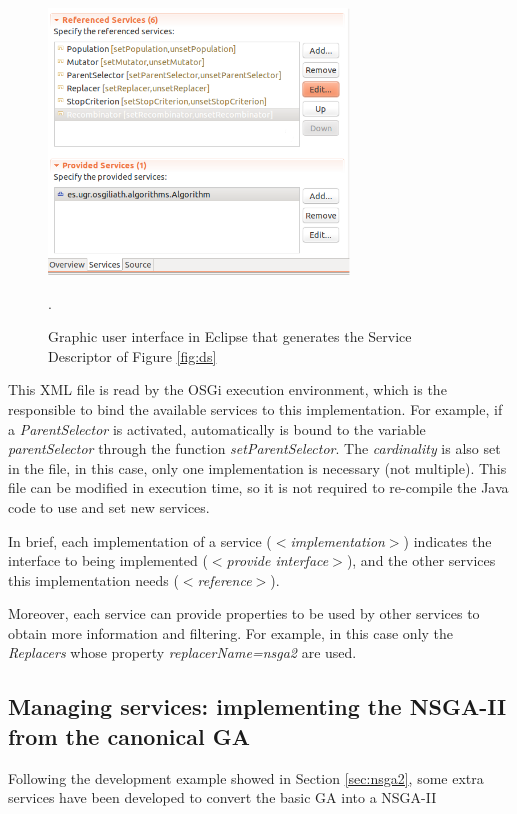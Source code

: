\begin{figure}
\centering
\includegraphics[width=8cm]{gfx/osgiliath/eclipse.png}

\caption{Graphic user interface in Eclipse that generates the Service Descriptor of Figure \ref{fig:ds} }.
\label{fig:xmlgui}
\end{figure}



This XML file is read by the OSGi execution environment, which is the
responsible to bind the available services to this implementation. For
example, if a {\em ParentSelector} is activated, automatically is
bound to the variable {\em parentSelector} through the function {\em
  setParentSelector}. The {\em cardinality} is also set in the file,
in this case, only one implementation is necessary (not
multiple). This file can be modified in execution time, so it is not
required to re-compile the Java code to use and set new services. %

In brief, each implementation of a service (\textit{$<$im\-ple\-men\-ta\-tion$>$}) indicates the interface to being implemented (\textit{$<$pro\-vi\-de in\-ter\-fa\-ce$>$}), and the other services this implementation needs (\textit{$<$re\-fe\-ren\-ce$>$}). 

Moreover, each service can provide properties to be used by other
services to obtain more information and filtering. For example, in
this case only the {\em Replacers} whose property {\em
  replacerName=nsga2} are used. 


\subsection{Managing services: implementing the NSGA-II from the canonical GA}

Following the development example showed in Section \ref{sec:nsga2},
some extra services have been developed to convert the basic GA into a
NSGA-II %

